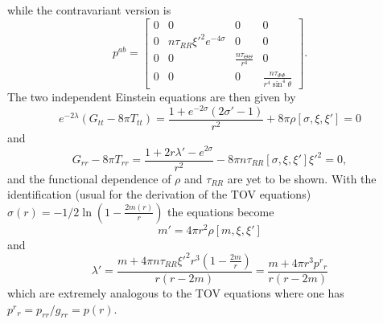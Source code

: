 while the contravariant version is
\begin{equation}
p^{ab} = \left[
  \begin{array}{cccc}
    0 & 0 & 0 & 0 \\
    0 & n\tau_{RR}\xi'^2 e^{-4\sigma}& 0 & 0 \\
    0 & 0 & \frac{n\tau_{\Theta\Theta}}{r^4} & 0 \\
    0 & 0 & 0 & \frac{n\tau_{\Phi\Phi} }{r^4\sin^4\theta}
  \end{array}
\right].
\end{equation}
The two independent Einstein equations are then given by
\begin{equation}
e^{-2\lambda}\left(G_{tt} - 8\pi T_{tt}\right) =
\frac{1+e^{-2\sigma}\left(2\sigma' - 1\right)}{r^2} +
8\pi\rho[\sigma,\xi,\xi']
= 0
\end{equation}
and
\begin{equation}
G_{rr} - 8\pi T_{rr} = \frac{1 + 2r\lambda' - e^{2\sigma}}{r^2} -
8\pi n\tau_{RR}[\sigma,\xi,\xi']\xi'^2 = 0,
\end{equation}
and the functional dependence of $\rho$ and $\tau_{RR}$ are yet to be
shown. With the identification (usual for the derivation of the TOV equations)
$\sigma(r) = -1/2\ln{\left(1-\frac{2m(r)}{r}\right)}$ the equations
become
\begin{equation}
m' = 4\pi r^2\rho[m,\xi,\xi']
\end{equation}
and
\begin{equation}
\lambda' = \frac{m + 4\pi n\tau_{RR}\xi'^2r^3 (1-\frac{2m}{r})}{r(r-2m)}
= \frac{m + 4\pi r^3 p^r{}_r}{r(r-2m)}
\end{equation}
which are extremely analogous to the TOV equations where one has $p^r{}_r
 = p_{rr}/g_{rr} = p(r)$.

